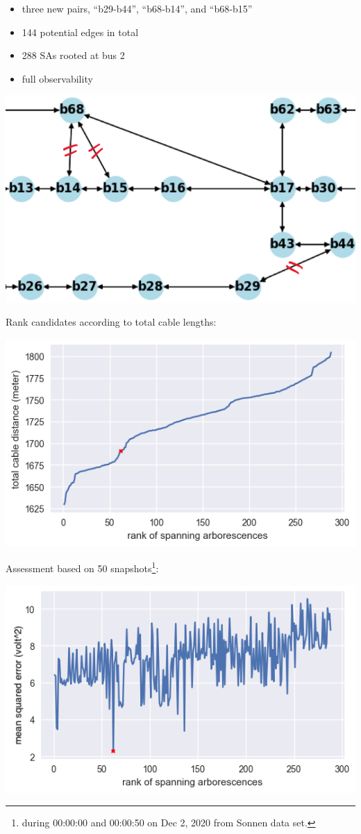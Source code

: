 \documentclass[
]{book}
\providecommand{\tightlist}{%
  \setlength{\itemsep}{0pt}\setlength{\parskip}{0pt}}
\begin{document}
\begin{itemize}
\tightlist
\item
  three new pairs, ``b29‐b44'', ``b68‐b14'', and ``b68‐b15''
\item
  144 potential edges in total
\item
  288 SAs rooted at bus 2
\item
  full observability
\end{itemize}

\begin{center}\includegraphics[width=0.55\linewidth]{Pictures/case70} \end{center}

Rank candidates according to total cable lengths:

\begin{center}\includegraphics{Pictures/distances_288} \end{center}

Assessment based on 50 snapshots\footnote{during 00:00:00 and 00:00:50 on Dec 2, 2020
  from Sonnen data set.}:

\begin{center}\includegraphics{Pictures/errors_288} \end{center}
\end{document}
